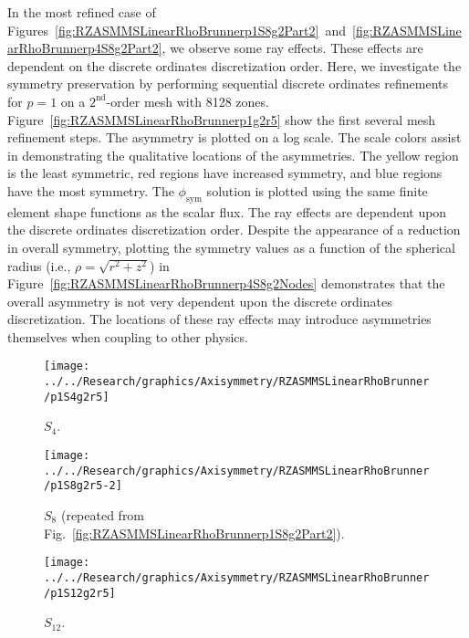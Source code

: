 \documentclass[12pt]{article}
\begin{document}
\FloatBarrier

In the most refined case of Figures~\ref{fig:RZASMMSLinearRhoBrunnerp1S8g2Part2}~and~\ref{fig:RZASMMSLinearRhoBrunnerp4S8g2Part2}, we observe some ray effects. These effects are dependent on the discrete ordinates discretization order. Here, we investigate the symmetry preservation by performing sequential discrete ordinates refinements for $p=1$ on a $2^\text{nd}$-order mesh with 8128 zones. Figure~\ref{fig:RZASMMSLinearRhoBrunnerp1g2r5} show the first several mesh refinement steps. The asymmetry is plotted on a log scale. The scale colors assist in demonstrating the qualitative locations of the asymmetries. The yellow region is the least symmetric, red regions have increased symmetry, and blue regions have the most symmetry. The $\phi_\text{sym}$ solution is plotted using the same finite element shape functions as the scalar flux. The ray effects are dependent upon the discrete ordinates discretization order. Despite the appearance of a reduction in overall symmetry, plotting the symmetry values as a function of the spherical radius (i.e., $\rho=\sqrt{r^2+z^2}$) in Figure~\ref{fig:RZASMMSLinearRhoBrunnerp4S8g2Nodes} demonstrates that the overall asymmetry is not very dependent upon the discrete ordinates discretization. The locations of these ray effects may introduce asymmetries themselves when coupling to other physics.

\begin{sidewaysfigure}[!htb]
\centering
\begin{subfigure}{0.33\textwidth}
\texttt{[image: ../../Research/graphics/Axisymmetry/RZASMMSLinearRhoBrunner/p1S4g2r5]}
\caption{$S_4$.}
\end{subfigure}%
\begin{subfigure}{0.33\textwidth}
\texttt{[image: ../../Research/graphics/Axisymmetry/RZASMMSLinearRhoBrunner/p1S8g2r5-2]}
\caption{$S_8$ (repeated from Fig.~\ref{fig:RZASMMSLinearRhoBrunnerp1S8g2Part2}).}
\end{subfigure}%
\begin{subfigure}{0.33\textwidth}
\texttt{[image: ../../Research/graphics/Axisymmetry/RZASMMSLinearRhoBrunner/p1S12g2r5]}
\caption{$S_{12}$.}
\end{subfigure}
\caption{Relative asymmetry for $p=1$ finite elements on a $2^\text{nd}$-order mesh with 8128 zones; mesh overlay may be removed for clarity.}
\label{fig:RZASMMSLinearRhoBrunnerp1g2r5}
\end{sidewaysfigure}
\end{document}
